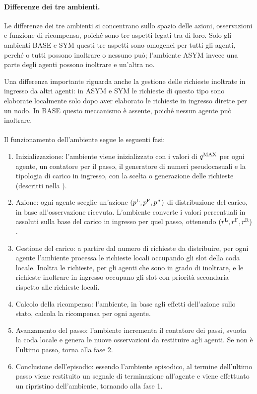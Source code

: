 \paragraph{Differenze dei tre ambienti.} Le differenze dei tre ambienti si concentrano sullo spazio delle azioni, osservazioni e funzione di ricompensa, poiché sono tre aspetti legati tra di loro. Solo gli ambienti BASE e SYM questi tre aspetti sono omogenei per tutti gli agenti, perché o tutti possono inoltrare o nessuno può; l'ambiente ASYM invece una parte degli agenti possono inoltrare e un'altra no.

Una differenza importante riguarda anche la gestione delle richieste inoltrate in ingresso da altri agenti: in ASYM e SYM le richieste di questo tipo sono elaborate localmente solo dopo aver elaborato le richieste in ingresso dirette per un nodo. In BASE questo meccanismo è assente, poiché nessun agente può inoltrare.

\paragraph{} Il funzionamento dell'ambiente segue le seguenti fasi:

\begin{enumerate}
    \item Inizializzazione: l'ambiente viene inizializzato con i valori di $q^\textnormal{MAX}$ per ogni agente, un contatore per il passo, il generatore di numeri pseudocasuali e la tipologia di carico in ingresso, con la scelta o generazione delle richieste (descritti nella ).

    \item Azione: ogni agente sceglie un'azione $(p^\textnormal{L}, p^\textnormal{F}, p^\textnormal{R})$ di distribuzione del carico, in base all'osservazione ricevuta. L'ambiente converte i valori percentuali in assoluti sulla base del carico in ingresso per quel passo, ottenendo $(r^\textnormal{L}, r^\textnormal{F}, r^\textnormal{R})$.

    \item Gestione del carico: a partire dal numero di richieste da distribuire, per ogni agente l'ambiente processa le richieste locali occupando gli slot della coda locale. Inoltra le richieste, per gli agenti che sono in grado di inoltrare, e le richieste inoltrare in ingresso occupano gli slot con priorità secondaria rispetto alle richieste locali.

    \item Calcolo della ricompensa: l'ambiente, in base agli effetti dell'azione sullo stato, calcola la ricompensa per ogni agente.

    \item Avanzamento del passo: l'ambiente incrementa il contatore dei passi, svuota la coda locale e genera le nuove osservazioni da restituire agli agenti. Se non è l'ultimo passo, torna alla fase 2. 

    \item Conclusione dell'episodio: essendo l'ambiente episodico, al termine dell'ultimo passo viene restituito un segnale di terminazione all'agente e viene effettuato un ripristino dell'ambiente, tornando alla fase 1.
\end{enumerate}